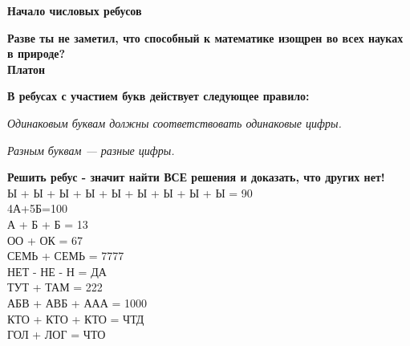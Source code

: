 \centerline{\bf \Huge Начало числовых ребусов}

\begin{flushright}
        \scriptsize{\textbf{Разве ты не заметил, что способный к математике изощрен во всех науках в природе?\\
         Платон}}
        
\end{flushright}

\textbf{В ребусах с участием букв действует следующее правило: }

\textit{Одинаковым буквам должны соответствовать одинаковые цифры.}

\textit{Разным буквам — разные цифры.}


\textbf{Решить ребус - значит найти ВСЕ решения и доказать, что других нет!}\\

 Ы + Ы + Ы + Ы + Ы + Ы + Ы + Ы + Ы = 90\\

 4А+5Б=100\\

 А + Б + Б = 13\\

 ОО + ОК = 67\\

 СЕМЬ + СЕМЬ = 7777\\

 НЕТ - НЕ  - Н = ДА\\

 ТУТ + ТАМ = 222\\

 АБВ + АВБ + ААА = 1000\\

 КТО + КТО + КТО = ЧТД\\

 ГОЛ + ЛОГ = ЧТО\\


